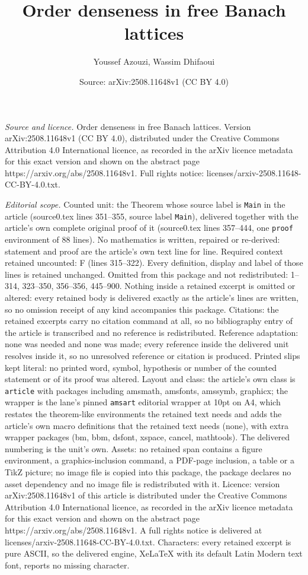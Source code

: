 \documentclass[10pt,a4paper]{amsart}
\title[Order denseness in free Banach lattices]{Order denseness in free Banach lattices}
\author{Youssef Azouzi, Wassim Dhifaoui}
\date{Source: arXiv:2508.11648v1 (CC BY 4.0)}
\begin{document}
\maketitle

\noindent\emph{Source and licence.} Order denseness in free Banach lattices. Version arXiv:2508.11648v1 (CC BY 4.0), distributed under the Creative Commons Attribution 4.0 International licence, as recorded in the arXiv licence metadata for this exact version and shown on the abstract page https://arxiv.org/abs/2508.11648v1. Full rights notice: licenses/arxiv-2508.11648-CC-BY-4.0.txt.\par\smallskip

\noindent\textit{Editorial scope.} Counted unit: the Theorem whose source label is \texttt{Main} in the article (source0.tex lines 351--355, source label \texttt{Main}), delivered together with the article's own complete original proof of it (source0.tex lines 357--444, one \texttt{proof} environment of 88 lines). No mathematics is written, repaired or re-derived: statement and proof are the article's own text line for line. Required context retained uncounted: F (lines 315--322). Every definition, display and label of those lines is retained unchanged. Omitted from this package and not redistributed: 1--314, 323--350, 356--356, 445--900. Nothing inside a retained excerpt is omitted or altered: every retained body is delivered exactly as the article's lines are written, so no omission receipt of any kind accompanies this package. Citations: the retained excerpts carry no citation command at all, so no bibliography entry of the article is transcribed and no reference is redistributed. Reference adaptation: none was needed and none was made; every reference inside the delivered unit resolves inside it, so no unresolved reference or citation is produced. Printed slips kept literal: no printed word, symbol, hypothesis or number of the counted statement or of its proof was altered. Layout and class: the article's own class is \texttt{article} with packages including amsmath, amsfonts, amssymb, graphicx; the wrapper is the lane's pinned \texttt{amsart} editorial wrapper at 10pt on A4, which restates the theorem-like environments the retained text needs and adds the article's own macro definitions that the retained text needs (none), with extra wrapper packages (bm, bbm, dsfont, xspace, cancel, mathtools). The delivered numbering is the unit's own. Assets: no retained span contains a figure environment, a graphics-inclusion command, a PDF-page inclusion, a table or a TikZ picture; no image file is copied into this package, the package declares no asset dependency and no image file is redistributed with it. Licence: version arXiv:2508.11648v1 of this article is distributed under the Creative Commons Attribution 4.0 International licence, as recorded in the arXiv licence metadata for this exact version and shown on the abstract page https://arxiv.org/abs/2508.11648v1. A full rights notice is delivered at licenses/arxiv-2508.11648-CC-BY-4.0.txt. Characters: every retained excerpt is pure ASCII, so the delivered engine, XeLaTeX with its default Latin Modern text font, reports no missing character.
\end{document}
